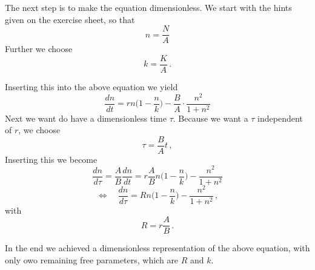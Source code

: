 \documentclass[11pt, a4paper, reqno]{scrartcl}
\begin{document}
		 The next step is to make the equation dimensionless. 
		 We start with the hints given on the exercise sheet, so that 
		 \[
		 n = \frac{N}{A}\]
		 Further we choose 
		 \[
		 k = \frac{K}{A}\, .\]
		 
		 Inserting this into the above equation we yield
		 \begin{equation}
		 \frac{dn}{dt} = r n \bigg(1 - \frac{n}{k}\bigg) - \frac{B}{A} \cdot \frac{n^2}{1 + n^2}
		 \end{equation}
		 Next we want do have a dimensionless time $\tau$. 
		 Because we want a $\tau$ independent of $r$, we choose 
		 \[
		 \tau = \frac{B}{A} t\, , \]
		 Inserting this we become
		 \begin{equation}
		 \frac{dn}{d \tau} = \frac{A}{B} \frac{dn}{dt} = r \frac{A}{B} n \bigg(1 - \frac{n}{k} \bigg) - \frac{n^2}{1 + n^2}
		 \end{equation}
		 \begin{equation}
		 \Leftrightarrow \quad \frac{dn}{d \tau} = R n \bigg(1 - \frac{n}{k} \bigg) - \frac{n^2}{1 + n^2}\, ,
		 \end{equation}
		 with 
		 \[
		 R = r \frac{A}{B}\, .\]
		 
		 In the end we achieved a dimensionless representation of the above equation, with only owo remaining free parameters, which are $R$ and $k$.
		 \\
		 
\end{document}
